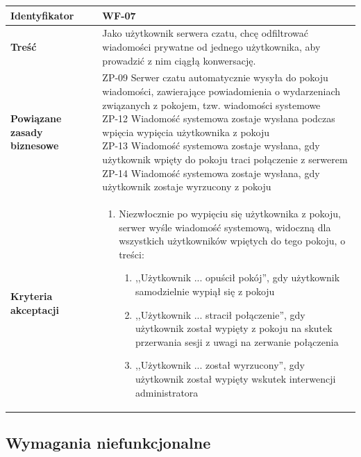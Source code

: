 \documentclass[11pt,oneside,a4paper,titlepage,onecolumn]{article}
\newenvironment{enumreq}
{ \begin{enumerate}[topsep=0pt,itemsep=-1ex,partopsep=1ex,parsep=1ex] }
{ \end{enumerate}                  }
\begin{document}
\vspace{2em} 

\begin{tabular}{ | l | l | }
	\hline
		\textbf{Identyfikator} & 
		WF-07
		\\
		
	\hline
		\textbf{Treść} & \parbox[t]{11cm}{
			Jako użytkownik serwera czatu, chcę odfiltrować
			wiadomości prywatne od jednego użytkownika, aby
			prowadzić z nim ciągłą konwersację.
		}\\
		 
	\hline
		\parbox[t]{4cm}{\textbf{Powiązane zasady biznesowe}} & \parbox[t]{11cm}{
			ZP-09 Serwer czatu automatycznie wysyła do pokoju
			wiadomości, zawierające powiadomienia o wydarzeniach
			związanych z pokojem, tzw. wiadomości systemowe \\
			ZP-12 Wiadomość systemowa zostaje wysłana podczas
			wpięcia wypięcia użytkownika z pokoju \\
			ZP-13 Wiadomość systemowa zostaje wysłana, gdy użytkownik
			wpięty do pokoju traci połączenie z serwerem \\
			ZP-14 Wiadomość systemowa zostaje wysłana, gdy użytkownik
			zostaje wyrzucony z pokoju
			
		}\\
		
	\hline
		\parbox[t]{4cm}{\textbf{Kryteria akceptacji}} & \parbox[t]{11cm}{
			\begin{enumreq}
				\item Niezwłocznie po wypięciu się użytkownika z
				pokoju, serwer wyśle wiadomość systemową, widoczną
				dla wszystkich użytkowników wpiętych do tego pokoju,
				o treści:
				\begin{enumerate}
					\item ,,Użytkownik ... opuścił pokój'', gdy
					użytkownik samodzielnie wypiął się z pokoju
					\item ,,Użytkownik ... stracił połączenie'',
					gdy użytkownik został wypięty z pokoju na skutek
					przerwania sesji z uwagi na zerwanie połączenia
					\item ,,Użytkownik ... został wyrzucony'', gdy
					użytkownik został wypięty wskutek interwencji
					administratora
				\end{enumerate}
			\end{enumreq}
			}
		\\

	\hline
\end{tabular}

\subsection{Wymagania niefunkcjonalne}
\end{document}
